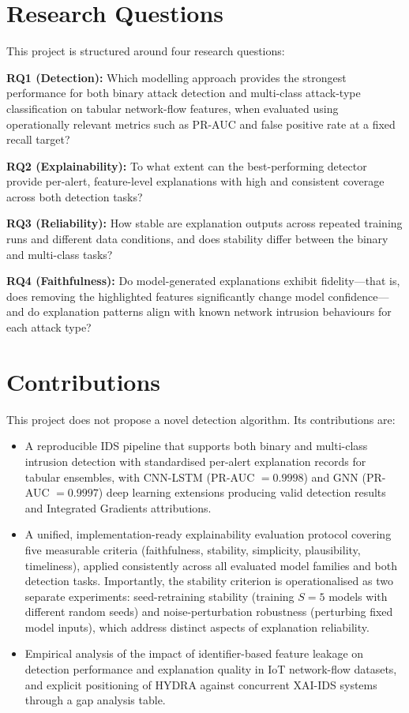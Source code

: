 \documentclass[12pt,a4paper]{report}
\begin{document}
\section{Research Questions}
\label{sec:rqs}

This project is structured around four research questions:

\noindent\textbf{RQ1 (Detection):} Which modelling approach provides the strongest performance for both binary attack detection and multi-class attack-type classification on tabular network-flow features, when evaluated using operationally relevant metrics such as PR-AUC and false positive rate at a fixed recall target?

\noindent\textbf{RQ2 (Explainability):} To what extent can the best-performing detector provide per-alert, feature-level explanations with high and consistent coverage across both detection tasks?

\noindent\textbf{RQ3 (Reliability):} How stable are explanation outputs across repeated training runs and different data conditions, and does stability differ between the binary and multi-class tasks?

\noindent\textbf{RQ4 (Faithfulness):} Do model-generated explanations exhibit fidelity---that is, does removing the highlighted features significantly change model confidence---and do explanation patterns align with known network intrusion behaviours for each attack type?

\section{Contributions}
\label{sec:contributions}

This project does not propose a novel detection algorithm. Its contributions are:
\begin{itemize}
  \item A reproducible IDS pipeline that supports both binary and multi-class intrusion detection with standardised per-alert explanation records for tabular ensembles, with CNN-LSTM (PR-AUC $= 0.9998$) and GNN (PR-AUC $= 0.9997$) deep learning extensions producing valid detection results and Integrated Gradients attributions.
  \item A unified, implementation-ready explainability evaluation protocol covering five measurable criteria (faithfulness, stability, simplicity, plausibility, timeliness), applied consistently across all evaluated model families and both detection tasks. Importantly, the stability criterion is operationalised as two separate experiments: seed-retraining stability (training $S = 5$ models with different random seeds) and noise-perturbation robustness (perturbing fixed model inputs), which address distinct aspects of explanation reliability.
  \item Empirical analysis of the impact of identifier-based feature leakage on detection performance and explanation quality in IoT network-flow datasets, and explicit positioning of HYDRA against concurrent XAI-IDS systems through a gap analysis table.
\end{itemize}
\end{document}
